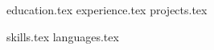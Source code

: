 \documentclass[letterpaper,11pt]{article}
\begin{document}

{education.tex}
{experience.tex}
{projects.tex}



{skills.tex}
{languages.tex}


\end{document}

